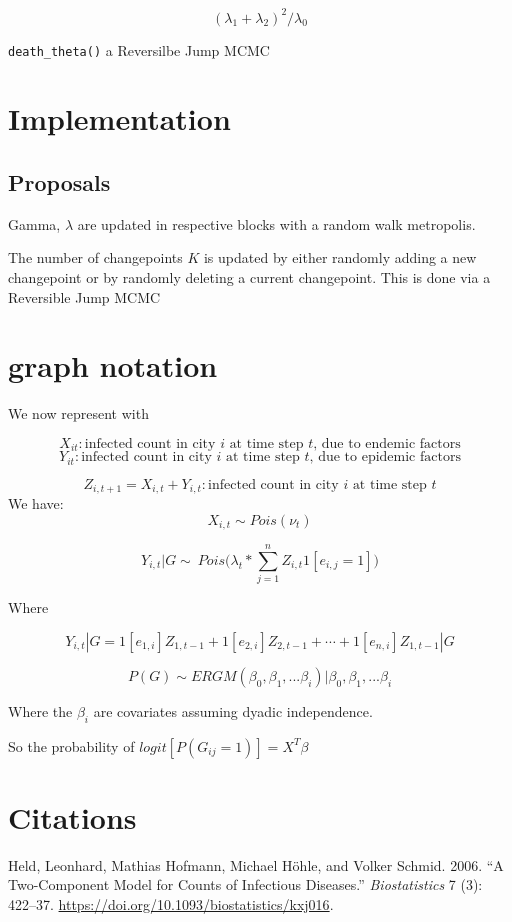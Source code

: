 \documentclass[]{article}
\numberwithin{equation}{section}
\begin{document}
\[(\lambda_1 + \lambda_2)^2/\lambda_0\]

\texttt{death\_theta()} a Reversilbe Jump MCMC

\hypertarget{implementation}{%
\section{Implementation}\label{implementation}}

\hypertarget{proposals}{%
\subsection{Proposals}\label{proposals}}

Gamma, \(\lambda\) are updated in respective blocks with a random walk
metropolis.

The number of changepoints \(K\) is updated by either randomly adding a
new changepoint or by randomly deleting a current changepoint. This is
done via a Reversible Jump MCMC

\hypertarget{graph-notation}{%
\section{graph notation}\label{graph-notation}}

We now represent with

\[X_{it}: \text{infected count in city } i \text{ at time step } t \text{, due to endemic factors}   \]
\[Y_{it} : \text{infected count in city } i \text{ at time step } t \text{, due to epidemic factors}   \]

\[Z_{i,t+1} = X_{i,t} + Y_{i,t}: \text{infected count in city } i \text{ at time step } t \]
We have: \[X_{i,t} \sim Pois(\nu_t)\]

\[Y_{i,t}|G \sim ~ Pois\big(\lambda_t*\sum_{j=1}^nZ_{i,t}1[e_{i,j}=1]\big) \]

Where

\[Y_{i,t} |G =   1[e_{1,i}]Z_{1,t-1} + 1[e_{2,i}]Z_{2,t-1} + \cdots + 1[e_{n,i}]Z_{1,t-1} | G  \]

\[P(G) \sim ERGM(\beta_0,\beta_1,...\beta_i)| \beta_0,\beta_1,...\beta_i\]

Where the \(\beta_i\) are covariates assuming dyadic independence.

So the probability of \(logit[P(G_{ij} = 1)] = X^T\beta\)

\hypertarget{citations}{%
\section*{Citations}\label{citations}}

\hypertarget{refs}{}
\leavevmode\hypertarget{ref-held_two-component_2006}{}%
Held, Leonhard, Mathias Hofmann, Michael Höhle, and Volker Schmid. 2006.
``A Two-Component Model for Counts of Infectious Diseases.''
\emph{Biostatistics} 7 (3): 422--37.
\url{https://doi.org/10.1093/biostatistics/kxj016}.
\end{document}

